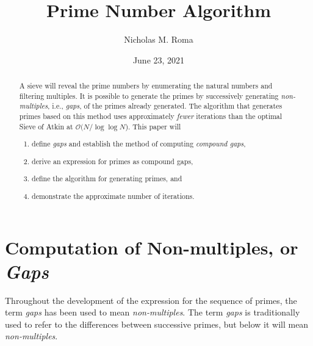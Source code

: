 \documentclass{article}
\title{Prime Number Algorithm}
\author{Nicholas M. Roma}
\date{June 23, 2021}
\begin{document}
\maketitle

\begin{abstract}
A sieve will reveal the prime numbers by enumerating the natural numbers and filtering multiples. It is possible to generate the primes by successively generating \emph{non-multiples}, i.e., \emph{gaps}, of the primes already generated. The algorithm that generates primes based on this method uses approximately \emph{fewer} iterations than the optimal Sieve of Atkin at $\mathcal{O}(N/\log \log N$). This paper will 
\begin{enumerate}
	\item define \emph{gaps} and establish the method of computing \emph{compound gaps}, 
	\item derive an expression for primes as compound gaps, 
	\item define the algorithm for generating primes, and
	\item demonstrate the approximate number of iterations. 
\end{enumerate} 
\end{abstract}

\section{Computation of Non-multiples, or \emph{Gaps}}

Throughout the development of the expression for the sequence of primes, the term \emph{gaps} has been used to mean \emph{non-multiples}. The term \emph{gaps} is traditionally used to refer to the differences between successive primes, but below it will mean \emph{non-multiples}.
\end{document}
